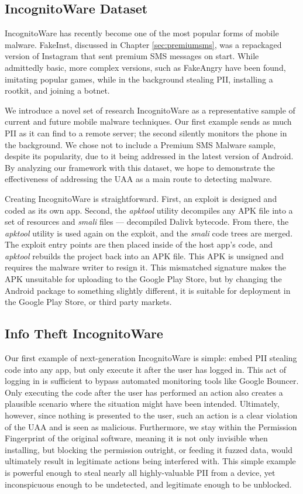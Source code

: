 \documentclass{acm_proc_article-sp}
\begin{document}
\subsection{IncognitoWare Dataset}
\label{sec:incognitoware}
IncognitoWare has recently become one of the most popular forms of mobile malware\citep{nq2013}. FakeInst, discussed in Chapter \ref{sec:premiumsms}, was a repackaged version of Instagram\citep{instagramandroid} that sent premium SMS messages on start. While admittedly basic, more complex versions, such as FakeAngry\citep{fakeangry} have been found, imitating popular games, while in the background stealing PII, installing a rootkit, and joining a botnet.

We introduce a novel set of research IncognitoWare as a representative sample of current and future mobile malware techniques. Our first example sends as much PII as it can find to a remote server; the second silently monitors the phone in the background. We chose not to include a Premium SMS Malware sample, despite its popularity\citep{nq2013}, due to it being addressed in the latest version of Android. By analyzing our framework with this dataset, we hope to demonstrate the effectiveness of addressing the UAA as a main route to detecting malware.

Creating IncognitoWare is straightforward. First, an exploit is designed and coded as its own app. Second, the \textit{apktool}\citep{apktool} utility decompiles any APK file into a set of resources and \textit{smali} files --- decompiled Dalivk bytecode. From there, the \textit{apktool} utility is used again on the exploit, and the \textit{smali} code trees are merged. The exploit entry points are then placed inside of the host app's code, and \textit{apktool} rebuilds the project back into an APK file. This APK is unsigned and requires the malware writer to resign it. This mismatched signature makes the APK unsuitable for uploading to the Google Play Store, but by changing the Android package to something slightly different, it is suitable for deployment in the Google Play Store, or third party markets.


\subsection{Info Theft IncognitoWare}
Our first example of next-generation IncognitoWare is simple: embed PII stealing code into any app, but only execute it after the user has logged in. This act of logging in is sufficient to bypass automated monitoring tools like Google Bouncer. Only executing the code after the user has performed an action also creates a plausible scenario where the situation might have been intended. Ultimately, however, since nothing is presented to the user, such an action is a clear violation of the UAA and is seen as malicious. Furthermore, we stay within the Permission Fingerprint of the original software, meaning it is not only invisible when installing, but blocking the permission outright, or feeding it fuzzed data, would ultimately result in legitimate actions being interfered with. This simple example is powerful enough to steal nearly all highly-valuable PII from a device, yet inconspicuous enough to be undetected, and legitimate enough to be unblocked.
\end{document}
